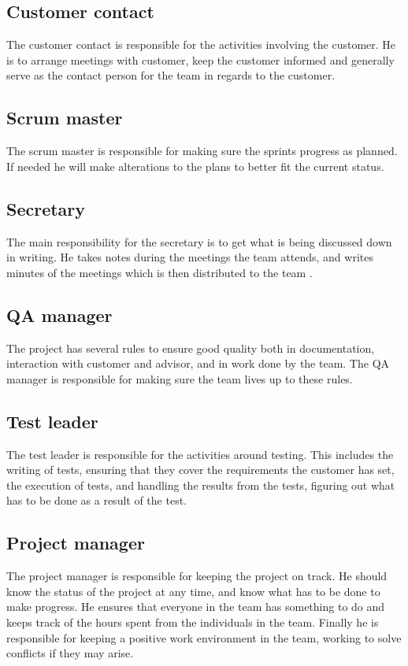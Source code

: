 \documentclass[11pt]{book}
\begin{document}
\subsection{Customer contact}
The customer contact is responsible for the activities involving the customer. He is to arrange meetings with customer, keep the customer informed and generally serve as the contact person for the team in regards to the customer.

\subsection{Scrum master}
The scrum master is responsible for making sure the sprints progress as planned. If needed he will make alterations to the plans to better fit the current status.

\subsection{Secretary}
The main responsibility for the secretary is to get what is being discussed down in writing. He takes notes during the meetings the team attends, and writes minutes of the meetings which is then distributed to the team .

\subsection{QA manager}
The project has several rules to ensure good quality both in documentation, interaction with customer and advisor, and in work done by the team. The QA manager is responsible for making sure the team lives up to these rules.

\subsection{Test leader}
The test leader is responsible for the activities around testing. This includes the writing of tests, ensuring that they cover the requirements the customer has set, the execution of tests, and handling the results from the tests, figuring out what has to be done as a result of the test.

\subsection{Project manager}
The project manager is responsible for keeping the project on track. He should know the status of the project at any time, and know what has to be done to make progress. He ensures that everyone in the team has something to do and keeps track of the hours spent from the individuals in the team. Finally he is responsible for keeping a positive work environment in the team, working to solve conflicts if they may arise.
\end{document}
